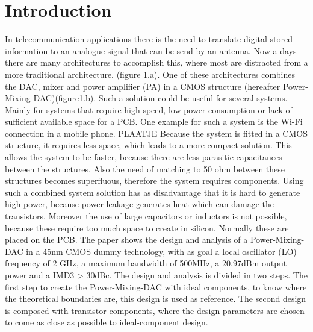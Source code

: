 \section{Introduction} \label{sec:introduction}
In telecommunication applications there is the need to translate digital stored information to an analogue signal that can be send by an antenna. Now a days there are many architectures to accomplish this, where most are distracted from a more traditional architecture. (figure 1.a). One of these architectures combines the DAC, mixer and power amplifier (PA) in a CMOS structure (hereafter Power-Mixing-DAC)(figure1.b). Such a solution could be useful for several systems. Mainly for systems that require high speed, low power consumption or lack of sufficient available space for a PCB. One example for such a system is the Wi-Fi connection in a mobile phone.
PLAATJE
Because the system is fitted in a CMOS structure, it requires less space, which leads to a more compact solution. This allows the system to be faster, because there are less parasitic capacitances between the structures. Also the need of matching to 50 ohm between these structures becomes superfluous, therefore the system requires components. Using such a combined system solution has as disadvantage that it is hard to generate high power, because power leakage generates heat which can damage the transistors. Moreover the use of large capacitors or inductors is not possible, because these require too much space to create in silicon. Normally these are placed on the PCB.
The paper shows the design and analysis of a Power-Mixing-DAC in a 45nm CMOS dummy technology, with as goal a local oscillator (LO) frequency of 2 GHz, a maximum bandwidth of 500MHz, a 20.97dBm output power and a IMD3 > 30dBc. The design and analysis is divided in two steps. The first step to create the Power-Mixing-DAC with ideal components, to know where the theoretical boundaries are, this design is used as reference. The second design is composed with transistor components, where the design parameters are chosen to come as close as possible to ideal-component design.  




